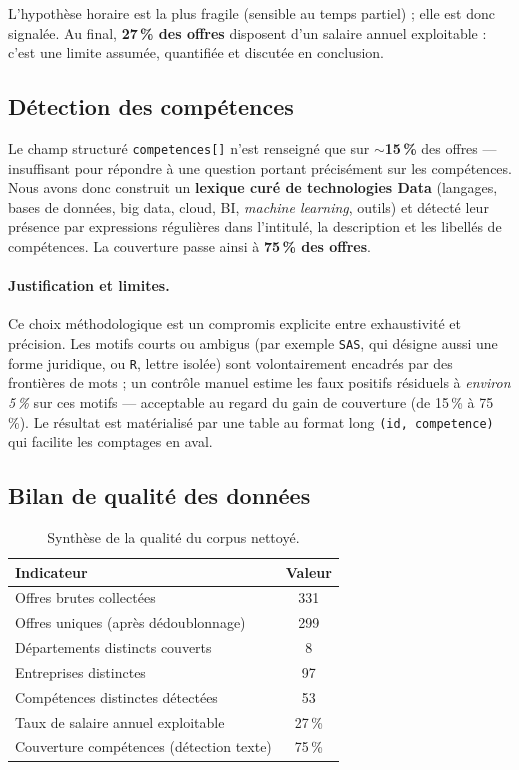 \documentclass[11pt,a4paper]{article}
\begin{document}
L'hypothèse horaire est la plus fragile (sensible au temps partiel) ; elle est
donc signalée. Au final, \textbf{27\,\% des offres} disposent d'un salaire annuel
exploitable : c'est une limite assumée, quantifiée et discutée en conclusion.

\subsection{Détection des compétences}

Le champ structuré \texttt{competences[]} n'est renseigné que sur \textbf{$\sim$15\,\%}
des offres — insuffisant pour répondre à une question portant précisément sur les
compétences. Nous avons donc construit un \textbf{lexique curé de technologies
Data} (langages, bases de données, big data, cloud, BI, \emph{machine learning},
outils) et détecté leur présence par expressions régulières dans l'intitulé, la
description et les libellés de compétences. La couverture passe ainsi à
\textbf{75\,\% des offres}.

\paragraph{Justification et limites.} Ce choix méthodologique est un compromis
explicite entre exhaustivité et précision. Les motifs courts ou ambigus (par
exemple \texttt{SAS}, qui désigne aussi une forme juridique, ou \texttt{R}, lettre
isolée) sont volontairement encadrés par des frontières de mots ; un contrôle
manuel estime les faux positifs résiduels à \emph{environ 5\,\%} sur ces motifs —
acceptable au regard du gain de couverture (de 15\,\% à 75\,\%). Le résultat est
matérialisé par une table au format long \texttt{(id, competence)} qui facilite
les comptages en aval.

\subsection{Bilan de qualité des données}

\begin{table}[h]
\centering\small
\begin{tabular}{lc}
\toprule
\textbf{Indicateur} & \textbf{Valeur} \\
\midrule
Offres brutes collectées & 331 \\
Offres uniques (après dédoublonnage) & 299 \\
Départements distincts couverts & 8 \\
Entreprises distinctes & 97 \\
Compétences distinctes détectées & 53 \\
Taux de salaire annuel exploitable & 27\,\% \\
Couverture compétences (détection texte) & 75\,\% \\
\bottomrule
\end{tabular}
\caption{Synthèse de la qualité du corpus nettoyé.}
\end{table}
\end{document}
